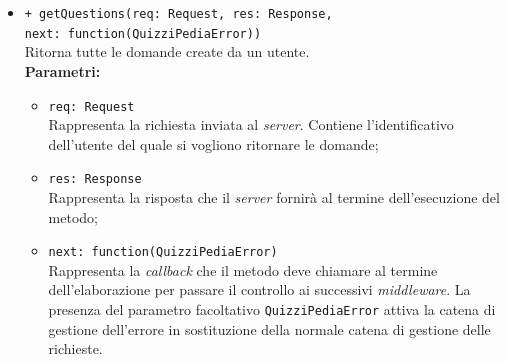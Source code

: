 \begin{itemize}
\begin{itemize}
					\item \texttt{+ getQuestions(req: Request, res: Response,\\ next: function(QuizziPediaError))}\\
					Ritorna tutte le domande create da un utente.\\
					\textbf{Parametri:}
					\begin{itemize}
					\item \texttt{req: Request} \\
						Rappresenta la richiesta inviata al \textit{server}. Contiene l'identificativo dell'utente del quale si vogliono ritornare le domande;
						\item \texttt{res: Response} \\
						Rappresenta la risposta che il \textit{server} fornirà al termine dell'esecuzione del metodo;
						\item \texttt{next: function(QuizziPediaError)} \\
						Rappresenta la \textit{callback} che il metodo deve chiamare al termine dell'elaborazione per passare il controllo ai successivi \textit{middleware}. La presenza del parametro facoltativo \texttt{QuizziPediaError} attiva la catena di gestione dell'errore in sostituzione della normale catena di gestione delle richieste.
					\end{itemize}
			\end{itemize}
	\end{itemize}